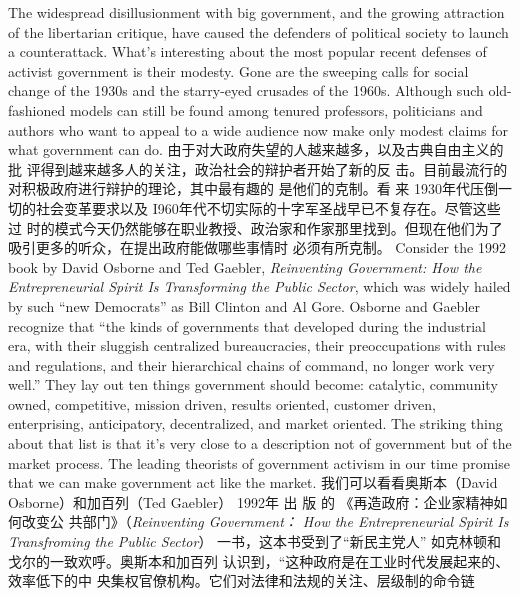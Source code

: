\begin{paracol}{2}
The widespread disillusionment with big government, and the
growing attraction of the libertarian critique, have caused the
defenders of political society to launch a counterattack. What's
interesting about the most popular recent defenses of activist
government is their modesty. Gone are the sweeping calls for
social change of the 1930s and the starry-eyed crusades of the 1960s. Although such old-fashioned models can still be found
among tenured professors, politicians and authors who want to
appeal to a wide audience now make only modest claims for
what government can do.
\switchcolumn
由于对大政府失望的人越来越多，以及古典自由主义的批
评得到越来越多人的关注，政治社会的辩护者开始了新的反
击。目前最流行的对积极政府进行辩护的理论，其中最有趣的
是他们的克制。看 来 1930年代压倒一切的社会变革要求以及
I960年代不切实际的十字军圣战早已不复存在。尽管这些过
时的模式今天仍然能够在职业教授、政治家和作家那里找到。但现在他们为了吸引更多的听众，在提出政府能做哪些事情时
必须有所克制。
\switchcolumn*
Consider the 1992 book by David Osborne and Ted Gaebler,
\textit{Reinventing Government: How the Entrepreneurial Spirit Is Transforming the Public Sector}, which was widely hailed by such ``new
Democrats'' as Bill Clinton and Al Gore. Osborne and Gaebler
recognize that ``the kinds of governments that developed during the industrial era, with their sluggish centralized bureaucracies, their preoccupations with rules and regulations, and their
hierarchical chains of command, no longer work very well.''
They lay out ten things government should become: catalytic,
community owned, competitive, mission driven, results oriented, customer driven, enterprising, anticipatory, decentralized, and market oriented. The striking thing about that list is
that it's very close to a description not of government but of the
market process. The leading theorists of government activism
in our time promise that we can make government act like the
market.
\switchcolumn
我们可以看看奥斯本（David Osborne）和加百列（Ted Gaebler） 1992年 出 版 的 《再造政府：企业家精神如何改变公
共部门》（\textit{Reinventing Government： How the Entrepreneurial Spirit Is Transfroming the Public Sector}） 一书，这本书受到了“新民主党人” 如克林顿和戈尔的一致欢呼。奥斯本和加百列
认识到，“这种政府是在工业时代发展起来的、效率低下的中
央集权官僚机构。它们对法律和法规的关注、层级制的命令链

\end{paracol}
